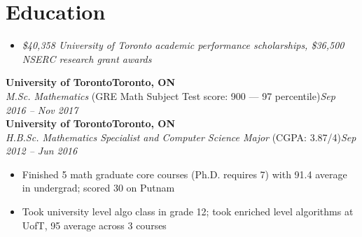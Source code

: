 \documentclass[10pt,letterpaper]{article}
\newcommand*\company[1]{\textbf{#1}}
\newcommand*\position[1]{\textit{#1}}
\newcommand*\location\company
\newcommand*\timespan\position
\begin{document}
\section*{Education}
\begin{itemize}
\item \textit{\$40,358 University of Toronto academic performance scholarships, \$36,500 NSERC research grant awards}
\end{itemize}
\company{University of Toronto}\hfill\location{Toronto, ON}\\
\position{M.Sc. Mathematics} (GRE Math Subject Test score: 900 --- 97 percentile)\hfill\timespan{Sep 2016 -- Nov 2017}
\\
\company{University of Toronto}\hfill\location{Toronto, ON}\\
\position{H.B.Sc. Mathematics Specialist and Computer Science Major} (CGPA: 3.87/4)\hfill\timespan{Sep 2012 -- Jun 2016}
\begin{itemize}
\item Finished 5 math graduate core courses (Ph.D. requires 7) with 91.4 average in undergrad; scored 30 on Putnam
\item Took university level algo class in grade 12; took enriched level algorithms at UofT, 95 average across 3 courses
\end{itemize}
\end{document}
